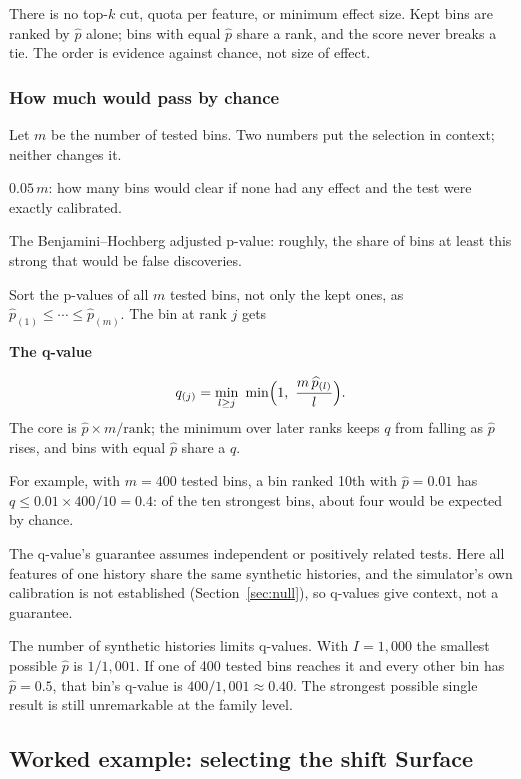 \documentclass[11pt]{article}
\newcommand{\topic}[1]{\Needspace{6\baselineskip}\subsubsection*{#1}}
\newenvironment{keyconcept}[1]{%
  \par\addvspace{8pt}\begin{lrbox}{\conceptbox}%
  \begin{minipage}{\dimexpr\linewidth-24pt\relax}%
  \setlength{\parindent}{0pt}%
  {\normalsize\bfseries\color{ConceptInk}#1\par}\large
}{%
  \end{minipage}\end{lrbox}%
  \noindent{\setlength{\fboxsep}{12pt}%
  \colorbox{ConceptPaper}{\usebox{\conceptbox}}}\par\addvspace{8pt}}
\begin{document}
There is no top-$k$ cut, quota per feature, or minimum effect size. Kept
bins are ranked by $\widehat p$ alone; bins with equal $\widehat p$ share a
rank, and the score never breaks a tie. The order is evidence against
chance, not size of effect.

\topic{How much would pass by chance}

Let $m$ be the number of tested bins. Two numbers put the selection in
context; neither changes it.
\begin{description}[font=\normalfont\large\bfseries\color{ConceptInk}]
 \item[Expected by chance] $0.05\,m$: how many bins would clear if none had
       any effect and the test were exactly calibrated.
 \item[q-value] The Benjamini--Hochberg adjusted p-value: roughly, the share
       of bins at least this strong that would be false discoveries.
\end{description}
Sort the p-values of all $m$ tested bins, not only the kept ones, as
$\widehat p_{(1)}\leq\cdots\leq\widehat p_{(m)}$. The bin at rank $j$ gets
\begin{keyconcept}{The q-value}
\[
 q_{(j)}=\min_{l\geq j}\ \min\Bigl(1,\ \frac{m\,\widehat p_{(l)}}{l}\Bigr).
\]
\normalsize The core is $\widehat p\times m/\text{rank}$; the minimum over
later ranks keeps $q$ from falling as $\widehat p$ rises, and bins with equal
$\widehat p$ share a $q$.
\end{keyconcept}
For example, with $m=400$ tested bins, a bin ranked 10th with
$\widehat p=0.01$ has $q\leq0.01\times400/10=0.4$: of the ten strongest bins,
about four would be expected by chance.

The q-value's guarantee assumes independent or positively related tests.
Here all features of one history share the same synthetic histories, and
the simulator's own calibration is not established (Section~\ref{sec:null}),
so q-values give context, not a guarantee.

The number of synthetic histories limits q-values. With $I=1{,}000$ the
smallest possible $\widehat p$ is $1/1{,}001$. If one of 400 tested bins
reaches it and every other bin has $\widehat p=0.5$, that bin's q-value is
$400/1{,}001\approx0.40$. The strongest possible single result is still
unremarkable at the family level.

\subsection{Worked example: selecting the shift Surface}
\end{document}
